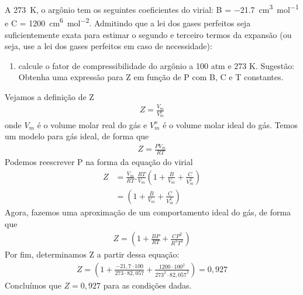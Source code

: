 \begin{xcs}
    A \qty{273}{K}, o argônio tem os seguintes coeficientes do virial: 
    B = \qty{-21,7}{cm^3.mol^{-1}} e C = \qty{1200}{cm^6 mol^{-2}}.
    Admitindo que a lei dos gases perfeitos seja
    suficientemente exata para estimar o segundo e terceiro termos da expansão
    (ou seja, use a lei dos gases perfeitos em caso de necessidade): 
    \begin{enumerate}[label=\alph*.]
        \item calcule o fator de compressibilidade do argônio a 100 atm e 273 K.
            Sugestão: Obtenha uma expressão para Z em função de P com B, C e T
            constantes. 
    \end{enumerate}
\end{xcs}
\begin{rsl}
    Vejamos a definição de Z
    \begin{align*}
        Z = \frac{V_m}{V_m^o} 
    \end{align*}
    onde \( V_m \) é o volume molar real do gás e \( V_m^o \) é o volume molar
    ideal do gás. Temos um modelo para gás ideal, de forma que
    \begin{align*}
        Z = \frac{PV_m}{RT} 
    \end{align*}
    Podemos reescrever P na forma da equação do virial
    \begin{align*}
        Z &= \frac{V_m}{RT} . \frac{RT}{V_m} \left(1 + \frac{B}{V_m} +
        \frac{C}{V_m^2}  \right)\\
        &= \left( 1 + \frac{B}{V_m} + \frac{C}{V_m^2}  \right)
    \end{align*}
    Agora, fazemos uma aproximação de um comportamento ideal do gás, de forma
    que
    \begin{align*}
        Z = \left( 1 + \frac{BP}{RT} + \frac{CP^2}{R^2T^2}  \right)
    \end{align*}
    Por fim, determinamos Z a partir dessa equação:
    \begin{align*}
        Z = \left(1 + \frac{-21,7 \cdot 100}{273 \cdot 82,057} + 
        \frac{1200 \cdot 100^2}{273^2 \cdot 82,057^2}\right) 
        = 0,927
    \end{align*}
    Concluímos que \( Z = 0,927 \) para as condições dadas.
\end{rsl}
